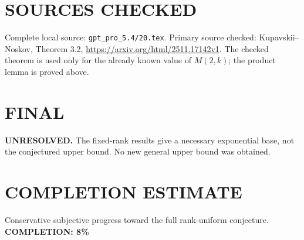 \section{SOURCES CHECKED}
Complete local source: \texttt{gpt\_pro\_5.4/20.tex}. Primary source checked: Kupavskii--Noskov, Theorem 3.2, \url{https://arxiv.org/html/2511.17142v1}. The checked theorem is used only for the already known value of $M(2,k)$; the product lemma is proved above.
\section{FINAL}
\textbf{UNRESOLVED.} The fixed-rank results give a necessary exponential base, not the conjectured upper bound. No new general upper bound was obtained.
\section{COMPLETION ESTIMATE}
Conservative subjective progress toward the full rank-uniform conjecture.
\textbf{COMPLETION: 8\%}
